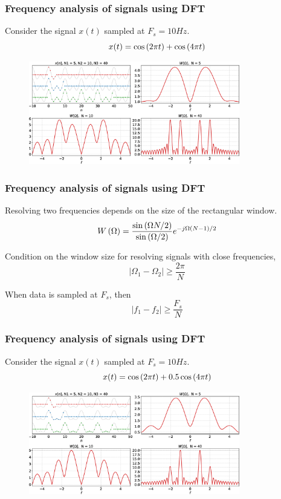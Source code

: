 \documentclass[aspectratio=169]{beamer}
\def\lp{\ensuremath\left(}
\def\rp{\ensuremath\right)}
\begin{document}
\begin{frame}[t]
  \frametitle{Frequency analysis of signals using DFT}
  Consider the signal $x(t)$ sampled at $F_s = 10Hz$.
  \[ x(t) = \cos \lp 2\pi t \rp + \cos\lp 4 \pi t\rp \]
  \begin{figure}
  \centering
  \includegraphics[width=0.82\textwidth]{img/dft-resolve1.eps}
  \end{figure}
\end{frame}


\begin{frame}[t]
  \frametitle{Frequency analysis of signals using DFT}
  Resolving two frequencies depends on the size of the rectangular window.
  \[ W\lp \Omega \rp = \frac{\sin \lp \Omega N / 2\rp}{\sin \lp \Omega / 2\rp}e^{-j \Omega \lp N - 1\rp / 2} \]

  Condition on the window size for resolving signals with close frequencies,
  \[ \vert \Omega_1 - \Omega_2 \vert \geq \frac{2\pi}{N} \]

  When data is sampled at $F_s$, then
  \[ \vert f_1 - f_2 \vert \geq \frac{F_s}{N} \]
\end{frame}


\begin{frame}[t]
  \frametitle{Frequency analysis of signals using DFT}
  Consider the signal $x(t)$ sampled at $F_s = 10Hz$.
  \[ x(t) = \cos \lp 2\pi t \rp + 0.5\cos\lp 4 \pi t\rp \]
  \begin{figure}
  \centering
  \includegraphics[width=0.82\textwidth]{img/dft-resolve2.eps}
  \end{figure}
\end{frame}
\end{document}
